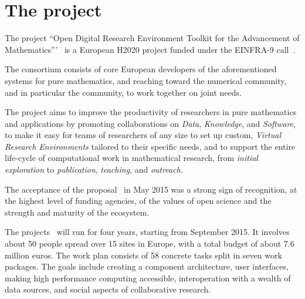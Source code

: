 \section{The \ODK project}\label{sec:odk}

The project ``Open Digital Research Environment Toolkit for the Advancement of
Mathematics'''~\cite{OpenDreamKit:on} is a European H2020 project funded under the
EINFRA-9 call~\cite{EINFRA-9}. 

The \ODK consortium consists of core European developers of the aforementioned systems
for pure mathematics, and reaching toward the numerical community, and in particular the
\Jupyter community, to work together on joint needs.

The project aims to improve the productivity of researchers in pure mathematics and
applications by promoting collaborations on \emph{Data}, \emph{Knowledge}, and
\emph{Software}, to make it easy for teams of researchers of any size to set up custom,
\emph{Virtual Research Environments} tailored to their specific needs, and
to support the entire life-cycle of computational work in mathematical research, from
\emph{initial exploration} to \emph{publication}, \emph{teaching}, and \emph{outreach}.

The acceptance of the proposal~\cite{ODKproposal:on} in May 2015 was a strong sign of
recognition, at the highest level of funding agencies, of the values of open science and
the strength and maturity of the ecosystem.

The \ODK projects~\cite{ODKproposal:on} will run for four years, starting from September
2015. It involves about 50 people spread over 15 sites in Europe, with a total budget of
about 7.6 million euros.
The \ODK work plan consists of 58 concrete tasks split in seven work packages. The goals
include creating a component architecture, user interfaces, making high performance
computing accessible, interoperation with a wealth of data sources, and social aspects
of collaborative research.




